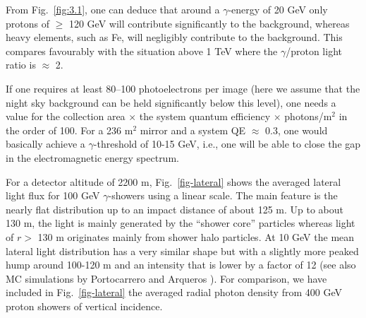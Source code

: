 From Fig.~\ref{fig:3.1}, one can deduce that around a $\gamma$-energy of 
20 GeV only protons of $\geq$ 120 GeV 
will contribute significantly to the background, whereas
heavy elements, such as Fe, 
will negligibly contribute to the background. This 
compares favourably with the situation above 
1 TeV where the $\gamma$/proton light ratio is $\approx$ 2.

If one requires at least 80--100 photoelectrons per image
(here we assume that the night sky 
background can be held significantly below this level),
one needs a value for the collection area $\times$ the 
system quantum efficiency $\times$ photons/m$^2$ in the order 
of 100. For a 236 m$^2$ mirror and a 
system QE $\approx$ 0.3, one would basically achieve a $\gamma$-threshold 
of 10-15 GeV, i.e., one will be 
able to close the gap in the electromagnetic energy spectrum. 

For a detector altitude of 2200 m, Fig.~\ref{fig-lateral} shows
the averaged lateral light
flux for 100 GeV $\gamma$-showers 
using a linear scale. The main feature is the
nearly flat distribution up to an impact distance of about 125 m.
Up to about 130 m, the light is mainly
generated by the ``shower core'' 
particles whereas light of $r >$ 130 m  originates
mainly from shower halo particles. At 10 
GeV the mean lateral light 
distribution has a very similar shape but with a
slightly more peaked hump around 
100-120 m and 
an intensity that is lower by a factor of 12 (see also MC 
simulations by Portocarrero 
and Arqueros \cite{arqueros:95}). 
For comparison, we have included in
Fig.~\ref{fig-lateral} 
the averaged radial photon density from 400 GeV proton
showers of vertical incidence.

